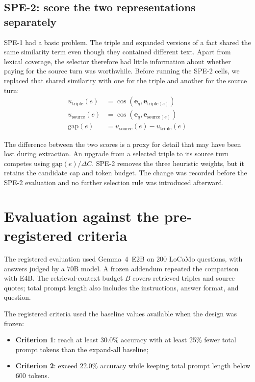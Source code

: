 \subsection{SPE-2: score the two representations separately}
SPE-1 had a basic problem. The triple and expanded versions of a fact shared the
same similarity term even though they contained different text. Apart from lexical coverage, the
selector therefore had little information about whether paying for the source turn was worthwhile.
Before running the SPE-2 cells, we replaced that shared similarity with one for the triple and another
for the source turn:
\begin{align}
  u_{\text{triple}}(e) &= \cos(\mathbf{e}_q, \mathbf{e}_{\text{triple}(e)}) \\
  u_{\text{source}}(e) &= \cos(\mathbf{e}_q, \mathbf{e}_{\text{source}(e)}) \\
  \text{gap}(e) &= u_{\text{source}}(e) - u_{\text{triple}}(e)
\end{align}

The difference between the two scores is a proxy for detail that may have been lost during extraction.
An upgrade from a selected triple to its source turn competes using $\text{gap}(e)/\Delta C$. SPE-2
removes the three heuristic weights, but it retains the candidate cap and token budget. The change was
recorded before the SPE-2 evaluation and no further selection rule was introduced afterward.

\section{Evaluation against the pre-registered criteria}
\label{sec:spe_results}

The registered evaluation used Gemma~4~E2B on 200 LoCoMo questions, with answers judged by a 70B
model. A frozen addendum repeated the comparison with E4B. The retrieval-context budget $B$ covers
retrieved triples and source quotes; total prompt length also includes the instructions, answer format,
and question.

The registered criteria used the baseline values available when the design was frozen:
\begin{itemize}
  \item \textbf{Criterion 1}: reach at least 30.0\% accuracy with at least 25\% fewer total prompt
        tokens than the expand-all baseline;
  \item \textbf{Criterion 2}: exceed 22.0\% accuracy while keeping total prompt length below 600 tokens.
\end{itemize}

